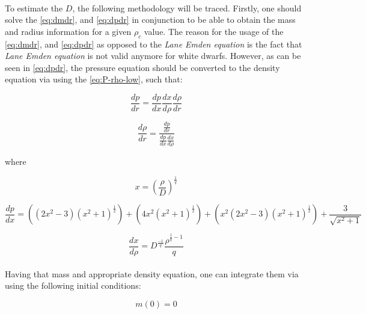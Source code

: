 \documentclass[letterpaper,12pt]{article}
\begin{document}
\paragraph{} To estimate the $D$, the following methodology will be traced. Firstly, one should solve the \eqref{eq:dmdr}, and \eqref{eq:dpdr} in conjunction to be able to obtain the mass and radius information for a given $\rho_c$ value. The reason for the usage of the \eqref{eq:dmdr}, and \eqref{eq:dpdr} as opposed to the \textit{Lane Emden equation} is the fact that \textit{Lane Emden equation} is not valid anymore for white dwarfs. However, as can be seen in \eqref{eq:dpdr}, the pressure equation should be converted to the density equation via using the \eqref{eq:P-rho-low}, such that:

\begin{equation*}
    \frac{dp}{dr} = \frac{dp}{dx} \frac{dx}{d \rho} \frac{d \rho}{dr} 
\end{equation*}

\begin{equation*}
    \frac{d \rho}{dr}  = \frac{ \frac{dp}{dr}}{ \frac{dp}{dx} \frac{dx}{d \rho} }
\end{equation*}

where 

\begin{equation*}
    x = \left(\frac{\rho}{D}\right)^{\frac{1}{q}}
\end{equation*}

\begin{equation*}
    \frac{dp}{dx} =  \left(\left(2  x ^ 2 - 3\right)  (x ^ 2 + 1) ^ {\frac{1}{2}}\right) + \left(4x^2  \left(x ^ 2 + 1\right) ^ {\frac{1}{2}}\right) + \left(x^2 (2  x ^ 2 - 3) \left(x ^ 2 + 1\right) ^ {\frac{1}{2}}\right) + \frac{3}{\sqrt{x ^ 2 + 1}}
\end{equation*}

\begin{equation*}
    \frac{dx}{d \rho} = D^{\frac{-1}{q}} \frac{\rho^{\frac{1}{q} - 1}}{q}
\end{equation*}

\paragraph{} Having that mass and appropriate density equation, one can integrate them via using the following initial conditions:

 \begin{equation*}
     m(0) = 0
 \end{equation*}
\end{document}
